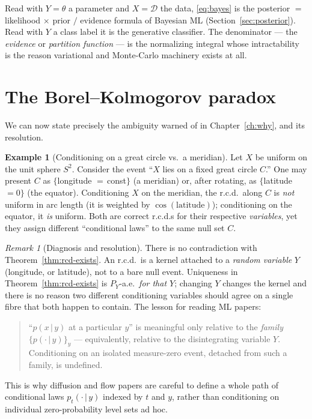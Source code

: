 \documentclass[11pt,oneside]{report}
\theoremstyle{plain}
\theoremstyle{definition}
\newtheorem{example}[theorem]{Example}
\theoremstyle{remark}
\newtheorem{remark}[theorem]{Remark}
\newcommand{\Dcal}{\mathcal{D}}
\newcommand{\given}{\,\vert\,}
\numberwithin{equation}{chapter}
\begin{document}
Read with $Y=\theta$ a parameter and $X=\Dcal$ the data, \eqref{eq:bayes}
is the posterior $=$ likelihood $\times$ prior $/$ evidence formula of
Bayesian ML (Section~\ref{sec:posterior}). Read with $Y$ a class label it
is the generative classifier. The denominator --- the \emph{evidence} or
\emph{partition function} --- is the normalizing integral whose
intractability is the reason variational and Monte-Carlo machinery exists
at all.

\section{The Borel--Kolmogorov paradox}\label{sec:bk-paradox}

We can now state precisely the ambiguity warned of in
Chapter~\ref{ch:why}, and its resolution.

\begin{example}[Conditioning on a great circle vs.\ a meridian]
\label{ex:bk}
Let $X$ be uniform on the unit sphere $S^2$. Consider the event ``$X$ lies
on a fixed great circle $C$.'' One may present $C$ as
$\{$longitude $=\,$const$\}$ (a meridian) or, after rotating, as
$\{$latitude $=0\}$ (the equator). Conditioning $X$ on the meridian, the
r.c.d.\ along $C$ is \emph{not} uniform in arc length (it is weighted by
$\cos(\text{latitude})$); conditioning on the equator, it \emph{is}
uniform. Both are correct r.c.d.s for their respective \emph{variables},
yet they assign different ``conditional laws'' to the same null set $C$.
\end{example}

\begin{remark}[Diagnosis and resolution]
There is no contradiction with Theorem~\ref{thm:rcd-exists}. An r.c.d.\ is a
kernel attached to a \emph{random variable} $Y$ (longitude, or latitude),
not to a bare null event. Uniqueness in Theorem~\ref{thm:rcd-exists} is
$P_Y$-a.e.\ \emph{for that $Y$}; changing $Y$ changes the kernel and there
is no reason two different conditioning variables should agree on a single
fibre that both happen to contain. The lesson for reading ML papers:
\begin{quote}
``$p(x\given y)$ at a particular $y$'' is meaningful only relative to the
\emph{family} $\{p(\cdot\given y)\}_y$ --- equivalently, relative to the
disintegrating variable $Y$. Conditioning on an isolated measure-zero
event, detached from such a family, is undefined.
\end{quote}
This is why diffusion and flow papers are careful to define a whole path of
conditional laws $p_t(\cdot\given y)$ indexed by $t$ and $y$, rather than
conditioning on individual zero-probability level sets ad hoc.
\end{remark}
\end{document}
